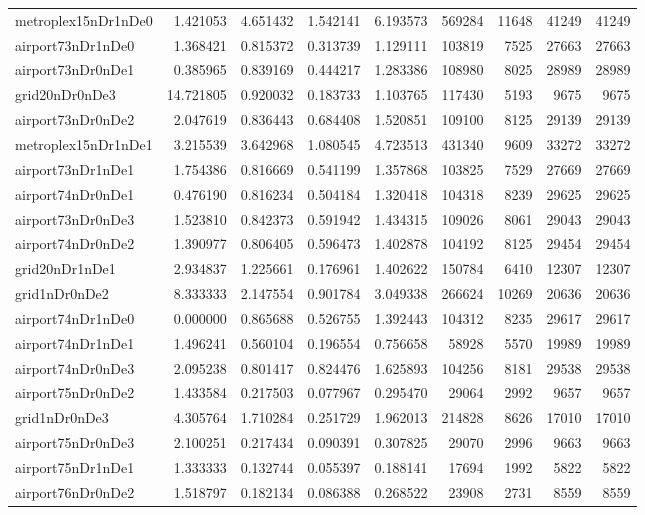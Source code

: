 \begin{longtable}{|l|r|r|r|r|r|r|r|r|}
metroplex15nDr1nDe0 & 1.421053 & 4.651432 & 1.542141 & 6.193573 & 569284 & 11648 & 41249 & 41249 \\
airport73nDr1nDe0 & 1.368421 & 0.815372 & 0.313739 & 1.129111 & 103819 & 7525 & 27663 & 27663 \\
airport73nDr0nDe1 & 0.385965 & 0.839169 & 0.444217 & 1.283386 & 108980 & 8025 & 28989 & 28989 \\
grid20nDr0nDe3 & 14.721805 & 0.920032 & 0.183733 & 1.103765 & 117430 & 5193 & 9675 & 9675 \\
airport73nDr0nDe2 & 2.047619 & 0.836443 & 0.684408 & 1.520851 & 109100 & 8125 & 29139 & 29139 \\
metroplex15nDr1nDe1 & 3.215539 & 3.642968 & 1.080545 & 4.723513 & 431340 & 9609 & 33272 & 33272 \\
airport73nDr1nDe1 & 1.754386 & 0.816669 & 0.541199 & 1.357868 & 103825 & 7529 & 27669 & 27669 \\
airport74nDr0nDe1 & 0.476190 & 0.816234 & 0.504184 & 1.320418 & 104318 & 8239 & 29625 & 29625 \\
airport73nDr0nDe3 & 1.523810 & 0.842373 & 0.591942 & 1.434315 & 109026 & 8061 & 29043 & 29043 \\
airport74nDr0nDe2 & 1.390977 & 0.806405 & 0.596473 & 1.402878 & 104192 & 8125 & 29454 & 29454 \\
grid20nDr1nDe1 & 2.934837 & 1.225661 & 0.176961 & 1.402622 & 150784 & 6410 & 12307 & 12307 \\
grid1nDr0nDe2 & 8.333333 & 2.147554 & 0.901784 & 3.049338 & 266624 & 10269 & 20636 & 20636 \\
airport74nDr1nDe0 & 0.000000 & 0.865688 & 0.526755 & 1.392443 & 104312 & 8235 & 29617 & 29617 \\
airport74nDr1nDe1 & 1.496241 & 0.560104 & 0.196554 & 0.756658 & 58928 & 5570 & 19989 & 19989 \\
airport74nDr0nDe3 & 2.095238 & 0.801417 & 0.824476 & 1.625893 & 104256 & 8181 & 29538 & 29538 \\
airport75nDr0nDe2 & 1.433584 & 0.217503 & 0.077967 & 0.295470 & 29064 & 2992 & 9657 & 9657 \\
grid1nDr0nDe3 & 4.305764 & 1.710284 & 0.251729 & 1.962013 & 214828 & 8626 & 17010 & 17010 \\
airport75nDr0nDe3 & 2.100251 & 0.217434 & 0.090391 & 0.307825 & 29070 & 2996 & 9663 & 9663 \\
airport75nDr1nDe1 & 1.333333 & 0.132744 & 0.055397 & 0.188141 & 17694 & 1992 & 5822 & 5822 \\
airport76nDr0nDe2 & 1.518797 & 0.182134 & 0.086388 & 0.268522 & 23908 & 2731 & 8559 & 8559 \\

\end{longtable}
